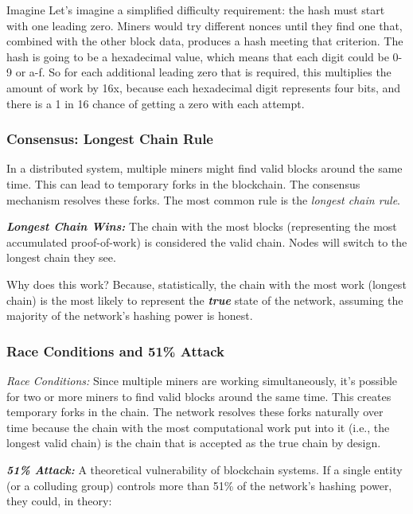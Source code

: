 \begin{example}{Imagine}
Let's imagine a simplified difficulty requirement: the hash must start with one leading zero. Miners would try different nonces until they find one that, combined with the other block data, produces a hash meeting that criterion. The hash is going to be a hexadecimal value, which means that each digit could be 0-9 or a-f. So for each additional leading zero that is required, this multiplies the amount of work by 16x, because each hexadecimal digit represents four bits, and there is a 1 in 16 chance of getting a zero with each attempt.	
\end{example}

\subsubsection{Consensus: Longest Chain Rule}

In a distributed system, multiple miners might find valid blocks around the same time. This can lead to temporary forks in the blockchain. The consensus mechanism resolves these forks. The most common rule is the \textit{longest chain rule}.

\textit{\textbf{Longest Chain Wins:}} The chain with the most blocks (representing the most accumulated proof-of-work) is considered the valid chain. Nodes will switch to the longest chain they see.

Why does this work? Because, statistically, the chain with the most work (longest chain) is the most likely to represent the \textbf{\textit{true}} state of the network, assuming the majority of the network's hashing power is honest.

\subsubsection{Race Conditions and 51\% Attack}

\textit{Race Conditions:} Since multiple miners are working simultaneously, it's possible for two or more miners to find valid blocks around the same time. This creates temporary forks in the chain. The network resolves these forks naturally over time because the chain with the most computational work put into it (i.e., the longest valid chain) is the chain that is accepted as the true chain by design.

\textbf{\textit{51\% Attack:}} A theoretical vulnerability of blockchain systems. If a single entity (or a colluding group) controls more than 51\% of the network's hashing power, they could, in theory:

